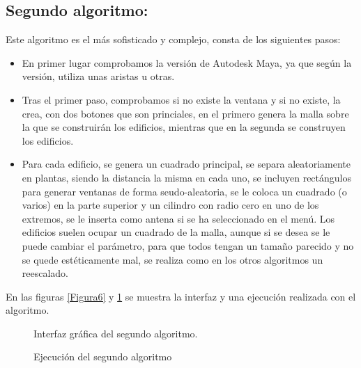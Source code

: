 \subsection{Segundo algoritmo:}

Este algoritmo es el más sofisticado y complejo, consta de los siguientes pasos:

\begin{itemize}
	\item En primer lugar comprobamos la versión de Autodesk Maya, ya que según la versión, utiliza unas aristas u otras.
	\item Tras el primer paso, comprobamos si no existe la ventana y si no existe, la crea, con dos botones que son princiales, en el primero genera la malla sobre la que se construirán los edificios, mientras que en la segunda se construyen los edificios.
	\item Para cada edificio, se genera un cuadrado principal, se separa aleatoriamente en plantas, siendo la distancia la misma en cada uno, se incluyen rectángulos para generar ventanas de forma seudo-aleatoria, se le coloca un cuadrado (o varios) en la parte superior y un cilindro con radio cero en uno de los extremos, se le inserta como antena si se ha seleccionado en el menú. Los edificios suelen ocupar un cuadrado de la malla, aunque si se desea se le puede cambiar el parámetro, para que todos tengan un tamaño parecido y no se quede estéticamente mal, se realiza como en los otros algoritmos un reescalado.
\end{itemize}

En las figuras \ref{Figura6} y \ref{Figura7} se muestra la interfaz y una ejecución realizada con el algoritmo.

\begin{figure}[h]

\hfill
\begin{minipage}[t]{.45\textwidth}
\begin{center}
\caption{Interfaz gráfica del segundo algoritmo.}
\label{Figura6}
\end{center}
\end{minipage}
\hfill
\begin{minipage}[t]{.45\textwidth}
\begin{center}
\caption{Ejecución del segundo algoritmo}
\label{Figura7}
\end{center}
\end{minipage}
\hfill
\end{figure}

